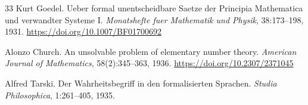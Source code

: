 \begin{thebibliography}{33}
Kurt Goedel.
Ueber formal unentscheidbare Saetze der Principia Mathematica und verwandter Systeme I.
\emph{Monatshefte fuer Mathematik und Physik}, 38:173--198, 1931.
\url{https://doi.org/10.1007/BF01700692}

Alonzo Church.
An unsolvable problem of elementary number theory.
\emph{American Journal of Mathematics}, 58(2):345--363, 1936.
\url{https://doi.org/10.2307/2371045}

Alfred Tarski.
Der Wahrheitsbegriff in den formalisierten Sprachen.
\emph{Studia Philosophica}, 1:261--405, 1935.

\end{thebibliography}



